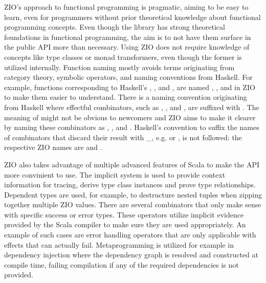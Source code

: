 ZIO's approach to functional programming is pragmatic, aiming to be easy to learn, even for programmers without prior theoretical knowledge about functional programming concepts. Even though the library has strong theoretical foundations in functional programming, the aim is to not have them surface in the public API more than necessary. Using ZIO does not require knowledge of concepts like type classes or monad transformers, even though the former is utilized internally. Function naming mostly avoids terms originating from category theory, symbolic operators, and naming conventions from Haskell. For example, functions corresponding to Haskell's , , and , are named , , and  in ZIO to make them easier to understand. There is a naming convention originating from Haskell where effectful combinators, such as , , and , are suffixed with . The meaning of  might not be obvious to newcomers and ZIO aims to make it clearer by naming these combinators as , , and .
Haskell's convention to suffix the names of combinators that discard their result with \_, e.g.  or , is not followed: the respective ZIO names are  and .

ZIO also takes advantage of multiple advanced features of Scala to make the API more convinient to use. The implicit system is used to provide context information for tracing, derive type class instances and prove type relationships. Dependent types are used, for example, to destructure nested tuples when zipping together multiple ZIO values. There are several combinators that only make sense with specific success or error types. These operators utilize implicit evidence provided by the Scala compiler to make sure they are used appropriately. An example of such cases are error handling operators that are only applicable with effects that can actually fail. Metaprogramming is utilized for example in dependency injection where the dependency graph is resolved and constructed at compile time, failing compilation if any of the required dependencies is not provided.

